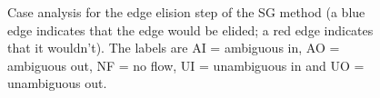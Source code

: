 \documentclass[preprint,a4paper]{elsarticle}
\newenvironment{stusubfig}[1]
{
	\begin{figure}[#1]
	\begin{center}
}
{
	\end{center}
	\end{figure}
}
\begin{document}
\begin{stusubfig}{p}
	\hspace{4mm}
\caption[Case analysis for the edge elision step of the SG method]{Case analysis for the edge elision step of the SG method (a blue edge indicates that the edge would be elided; a red edge indicates that it wouldn't). The labels are AI = ambiguous in, AO = ambiguous out, NF = no flow, UI = unambiguous in and UO = unambiguous out.}
\label{fig:segmentation-waterfall-smg-mergecases}
\end{stusubfig}
\end{document}

